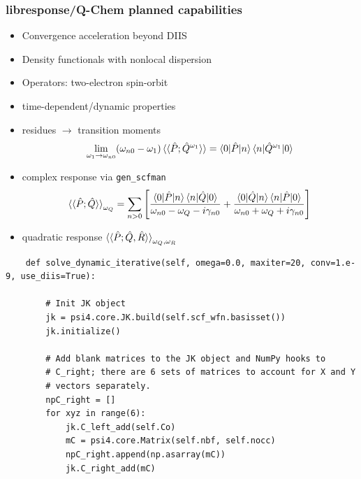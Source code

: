 \documentclass[%
    xcolor=usenames,dvipsnames,svgnames%
]{beamer}
\begin{document}
\begin{frame}
  \frametitle{libresponse/Q-Chem planned capabilities}
  \begin{itemize}
  \item Convergence acceleration beyond DIIS
  \item Density functionals with nonlocal dispersion
  \item Operators: two-electron spin-orbit
  \item time-dependent/dynamic properties
  \item residues \(\rightarrow\) transition moments
    \begin{equation*}
      \lim_{\omega_{1} \to \omega_{n0}} (\omega_{n0} - \omega_{1}) \braket{\braket{\hat{P};\hat{Q}^{\omega_{1}}}} = \braket{0|\hat{P}|n} \braket{n|\hat{Q}^{\omega_{1}}|0}
    \end{equation*}
  \item complex response via \texttt{gen\_scfman}
    \begin{equation*}
    \braket{\braket{\hat{P};\hat{Q}}}_{\omega_{Q}} = \sum_{n>0} \left[ \frac{\braket{0|\hat{P}|n}\braket{n|\hat{Q}|0}}{\omega_{n0} - \omega_{Q} - i\gamma_{n0}} + \frac{\braket{0|\hat{Q}|n}\braket{n|\hat{P}|0}}{\omega_{n0} + \omega_{Q} + i\gamma_{n0}} \right]
    \end{equation*}
  \item quadratic response \(\braket{\braket{\hat{P};\hat{Q},\hat{R}}}_{\omega_{Q},\omega_{R}}\)
  \end{itemize}
\end{frame}

\begin{frame}[fragile]
  \begin{verbatim}
    def solve_dynamic_iterative(self, omega=0.0, maxiter=20, conv=1.e-9, use_diis=True):

        # Init JK object
        jk = psi4.core.JK.build(self.scf_wfn.basisset())
        jk.initialize()

        # Add blank matrices to the JK object and NumPy hooks to
        # C_right; there are 6 sets of matrices to account for X and Y
        # vectors separately.
        npC_right = []
        for xyz in range(6):
            jk.C_left_add(self.Co)
            mC = psi4.core.Matrix(self.nbf, self.nocc)
            npC_right.append(np.asarray(mC))
            jk.C_right_add(mC)
  \end{verbatim}
\end{frame}
\end{document}
